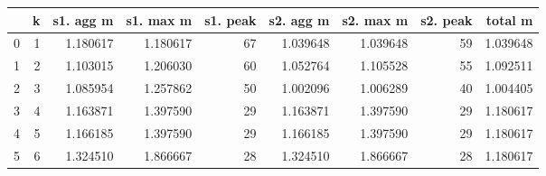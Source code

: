 \begin{tabular}{lrrrrrrrr}
\toprule
{} &  k &  s1. agg m &  s1. max m &  s1. peak &  s2. agg m &  s2. max m &  s2. peak &   total m \\
\midrule
0 &  1 &   1.180617 &   1.180617 &        67 &   1.039648 &   1.039648 &        59 &  1.039648 \\
1 &  2 &   1.103015 &   1.206030 &        60 &   1.052764 &   1.105528 &        55 &  1.092511 \\
2 &  3 &   1.085954 &   1.257862 &        50 &   1.002096 &   1.006289 &        40 &  1.004405 \\
3 &  4 &   1.163871 &   1.397590 &        29 &   1.163871 &   1.397590 &        29 &  1.180617 \\
4 &  5 &   1.166185 &   1.397590 &        29 &   1.166185 &   1.397590 &        29 &  1.180617 \\
5 &  6 &   1.324510 &   1.866667 &        28 &   1.324510 &   1.866667 &        28 &  1.180617 \\
\bottomrule
\end{tabular}

